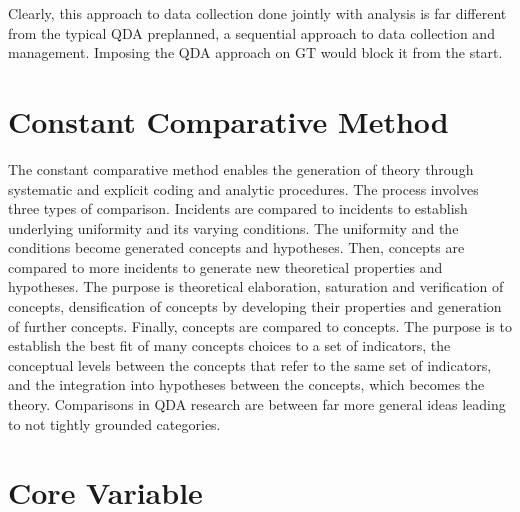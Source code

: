 Clearly, this approach to data collection done jointly with analysis is far different from the typical QDA preplanned, 
a sequential approach to data collection and management. 
Imposing the QDA approach on GT would block it from the start.

\section*{Constant Comparative Method}

The constant comparative method enables the generation of theory through systematic and explicit coding and analytic procedures. 
The process involves three types of comparison. 
Incidents are compared to incidents to establish underlying uniformity and its varying conditions. 
The uniformity and the conditions become generated concepts and hypotheses. 
Then, concepts are compared to more incidents to generate new theoretical properties and hypotheses. 
The purpose is theoretical elaboration, 
saturation and verification of concepts, 
densification of concepts by developing their properties and generation of further concepts. 
Finally, concepts are compared to concepts. 
The purpose is to establish the best fit of many concepts choices to a set of indicators, the conceptual levels between the concepts that refer to the same set of indicators, and the integration into hypotheses between the concepts, which becomes the theory. 
Comparisons in QDA research are between far more general ideas leading to not tightly grounded categories.

\section*{Core Variable}

